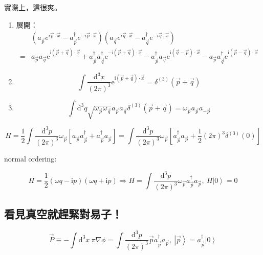 \documentclass{article}
\begin{document}
實際上，這很爽。

\begin{enumerate}
  \item 展開：$$\begin{aligned}
              & \left(a_{\vec{p}} e^{i \vec{p} \cdot \vec{x}}-a_{\vec{p}}^{\dagger} e^{-i \vec{p} \cdot \vec{x}}\right)\left(a_{\vec{q}} e^{i \vec{q} \cdot \vec{x}}-a_{\vec{q}}^{\dagger} e^{-i \vec{q} \cdot \vec{x}}\right)                                                                                                                                       \\
            = & a_{\vec{p}}a_{\vec{q}}\mathrm{e}^{\mathrm{i}(\vec{p}+\vec{q})\cdot\vec{x}}+a_{\vec{p}}^{\dagger}a_{\vec{q}}^{\dagger}\mathrm{e}^{-\mathrm{i}(\vec{p}+\vec{q})\cdot\vec{x}}-a_{\vec{p}}^{\dagger}a_{\vec{q}}\mathrm{e}^{\mathrm{i}(\vec{q}-\vec{p})\cdot\vec{x}}-a_{\vec{p}}a_{\vec{q}}^{\dagger}\mathrm{e}^{\mathrm{i}(\vec{p}-\vec{q})\cdot\vec{x}}
          \end{aligned}$$
  \item $$\int\frac{\mathrm{d}^3x}{(2\pi)^3}\mathrm{e}^{\mathrm{i}(\vec{p}+\vec{q})\cdot\vec{x}}=\delta^{(3)}\left(\vec{p}+\vec{q}\right)$$
  \item $$\int\mathrm{d}^3q\sqrt{\omega_{\vec{p}}\omega_{\vec{q}}}a_{\vec{p}}a_{\vec{q}}\delta^{(3)}\left(\vec{p}+\vec{q}\right)=\omega_{\vec{p}}a_{\vec{p}}a_{-\vec{p}}$$
\end{enumerate}

$$H=\frac{1}{2}\int\frac{\mathrm{d}^3p}{(2\pi)^3}\omega_{\vec{p}}\left[a_{\vec{p}}a_{\vec{p}}^{\dagger}+a_{\vec{p}}^{\dagger}a_{\vec{p}}\right]=\int\frac{\mathrm{d}^3p}{(2\pi)^3}\omega_{\vec{p}}\left[a_{\vec{p}}^{\dagger}a_{\vec{p}}+\frac{1}{2}(2\pi)^3\delta^{(3)}(0)\right]$$

normal ordering:

$$H=\frac{1}{2}(\omega q-\mathrm{i}p)(\omega q+\mathrm{i}p)\Rightarrow H=\int\frac{\mathrm{d}^3p}{(2\pi)^3}\omega_{\vec{p}}a_{\vec{p}}^{\dagger}a_{\vec{p}},\ H\left|0\right\rangle=0$$

\subsection{看見真空就趕緊對易子！}

$$\vec{P}\equiv-\int\mathrm{d}^3x\ \pi\nabla\phi=\int\frac{\mathrm{d}^3p}{(2\pi)^3}\vec{p}a_{\vec{p}}^{\dagger}a_{\vec{p}},\ \left|\vec{p}\right\rangle=a_{\vec{p}}^{\dagger}\left|0\right\rangle$$
\end{document}
